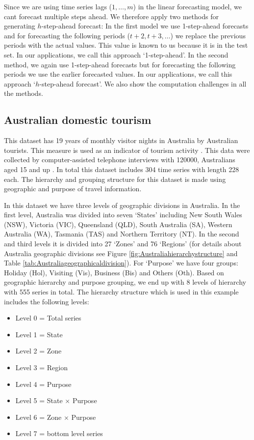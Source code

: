 \documentclass[11pt,a4paper,]{article}
\providecommand{\tightlist}{%
  \setlength{\itemsep}{0pt}\setlength{\parskip}{0pt}}
\begin{document}
Since we are using time series lags (\(1, \dots, m\)) in the linear forecasting model, we cant forecast multiple steps ahead. We therefore apply two methods for generating \(h\)-step-ahead forecast: In the first model we use 1-step-ahead forecasts and for forecasting the following periods (\(t+2,t+3,\dots\)) we replace the previous periods with the actual values. This value is known to us because it is in the test set. In our applications, we call this approach `1-step-ahead'. In the second method, we again use 1-step-ahead forecasts but for forecasting the following periods we use the earlier forecasted values. In our applications, we call this approach `\(h\)-step-ahead forecast'. We also show the computation challenges in all the methods.

\hypertarget{australian-domestic-tourism}{%
\subsection{Australian domestic tourism}\label{australian-domestic-tourism}}

This dataset has 19 years of monthly visitor nights in Australia by Australian tourists. This measure is used as an indicator of tourism activity \autocite{mint2018}. This data were collected by computer-assisted telephone interviews with 120000, Australians aged 15 and up \autocite[Research tourism][]{researchAustralia2005}. In total this dataset includes 304 time series with length 228 each. The hierarchy and grouping structure for this dataset is made using geographic and purpose of travel information.

In this dataset we have three levels of geographic divisions in Australia. In the first level, Australia was divided into seven `States' including New South Wales (NSW), Victoria (VIC), Queensland (QLD), South Australia (SA), Western Australia (WA), Tasmania (TAS) and Northern Territory (NT). In the second and third levels it is divided into 27 `Zones' and 76 `Regions' (for details about Australia geographic divisions see Figure \ref{fig:Australiahierarchystructure} and Table \ref{tab:Australiageographicaldivision}). For `Purpose' we have four groups: Holiday (Hol), Visiting (Vis), Business (Bis) and Others (Oth). Based on geographic hierarchy and purpose grouping, we end up with 8 levels of hierarchy with 555 series in total. The hierarchy structure which is used in this example includes the following levels:

\begin{itemize}
\tightlist
\item
  Level 0 = Total series
\item
  Level 1 = State
\item
  Level 2 = Zone
\item
  Level 3 = Region
\item
  Level 4 = Purpose
\item
  Level 5 = State \(\times\) Purpose
\item
  Level 6 = Zone \(\times\) Purpose
\item
  Level 7 = bottom level series
\end{itemize}
\end{document}
